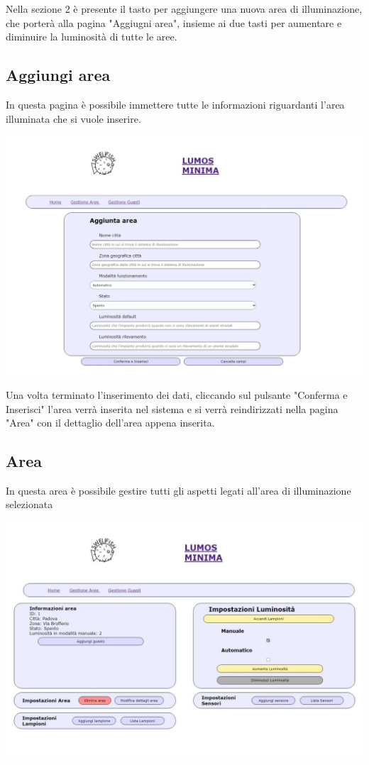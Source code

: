 \documentclass[9pt]{article}
\begin{document}
Nella sezione 2 è presente il tasto per aggiungere una nuova area di illuminazione, che porterà alla pagina "Aggiugni area", insieme ai due tasti per aumentare e diminuire la luminosità di tutte le aree.

\subsection{Aggiungi area}

In questa pagina è possibile immettere tutte le informazioni riguardanti l'area illuminata che si vuole inserire.

\begin{center}
	\includegraphics[scale=0.3]{Aggiungi_area.png}
\end{center}

Una volta terminato l'inserimento dei dati, cliccando sul pulsante "Conferma e Inserisci"
l'area verrà inserita nel sistema e si verrà reindirizzati nella pagina "Area" con il dettaglio dell'area appena inserita.

\subsection{Area}

In questa area è possibile gestire tutti gli aspetti legati all'area di illuminazione selezionata

\begin{center}
	\includegraphics[scale=0.3]{Area.png}
\end{center}
\end{document}
